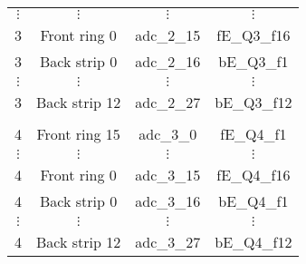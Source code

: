\begin{tabular}{cccc}
$\vdots$  &  $\vdots$                  &  $\vdots$     &  $\vdots$     \\
3         &  Front ring 0              &  adc\_2\_15   &  fE\_Q3\_f16  \\
3         &  Back strip 0              &  adc\_2\_16   &  bE\_Q3\_f1   \\
$\vdots$  &  $\vdots$                  &  $\vdots$     &  $\vdots$     \\
3         &  Back strip 12             &  adc\_2\_27   &  bE\_Q3\_f12  \\
          &                            &               &               \\
4         &  Front ring 15             &  adc\_3\_0    &  fE\_Q4\_f1   \\
$\vdots$  &  $\vdots$                  &  $\vdots$     &  $\vdots$     \\
4         &  Front ring 0              &  adc\_3\_15   &  fE\_Q4\_f16  \\
4         &  Back strip 0              &  adc\_3\_16   &  bE\_Q4\_f1   \\
$\vdots$  &  $\vdots$                  &  $\vdots$     &  $\vdots$     \\
4         &  Back strip 12             &  adc\_3\_27   &  bE\_Q4\_f12  \\
\hline
\end{tabular}